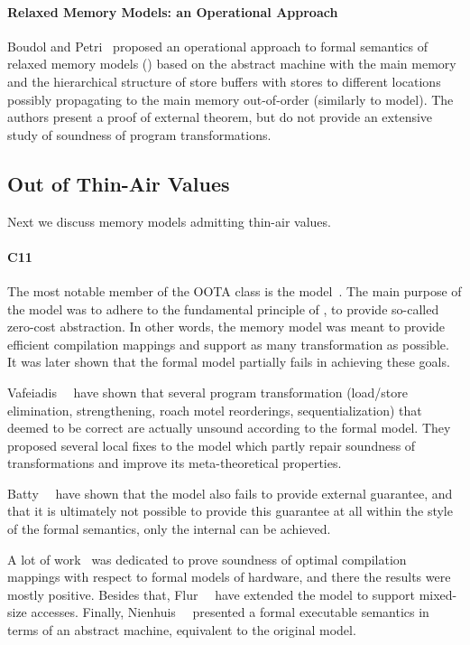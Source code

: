 \paragraph{Relaxed Memory Models: an Operational Approach}

Boudol and Petri~\cite{Boudol-Petri:POPL09} proposed 
an operational approach to 
formal semantics of relaxed memory models (\RMMOA)
based on the abstract machine with the main memory 
and the hierarchical structure of store buffers 
with stores to different locations possibly 
propagating to the main memory out-of-order
(similarly to \PSO model).
The authors present a proof of external \DRF theorem,
but do not provide an extensive study 
of soundness of program transformations.

\subsection{Out of Thin-Air Values}

Next we discuss memory models admitting thin-air values. 

\paragraph{C11}

The most notable member of the OOTA class is the \CMM model~\cite{Batty-al:POPL11}.
The main purpose of the \CMM model was to adhere to the fundamental principle of \CPP, 
\ie to provide so-called zero-cost abstraction. 
In other words, the memory model was meant to provide 
efficient compilation mappings and support as many transformation as possible.
It was later shown that the formal model partially fails in achieving these goals.

Vafeiadis~\etal~\cite{Vafeiadis-al:POPL15} have shown that several program transformation 
(load/store elimination, strengthening, roach motel reorderings, sequentialization) 
that deemed to be correct are actually unsound according to the formal model.
They proposed several local fixes to the model which 
partly repair soundness of transformations and improve 
its meta-theoretical properties. 

Batty~\etal~\cite{Batty-al:ESOP15} have shown that 
the model also fails to provide external \DRF guarantee, 
and that it is ultimately not possible to provide this guarantee
at all within the style of the \CMM formal semantics,
only the internal \DRF can be achieved. 

A lot of work~\cite{Batty-al:POPL11, Sarkar-al:PLDI12, Batty-al:POPL12, Batty-al:POPL16} 
was dedicated to prove soundness of optimal compilation mappings 
with respect to formal models of hardware, 
and there the results were mostly positive.
Besides that, Flur~\etal~\cite{Flur-al:POPL17} have extended the model to support mixed-size accesses.
Finally, Nienhuis~\etal~\cite{Nienhuis-al:OOPSLA16} presented 
a formal executable semantics in terms of an abstract machine, 
equivalent to the original \CMM model. 

